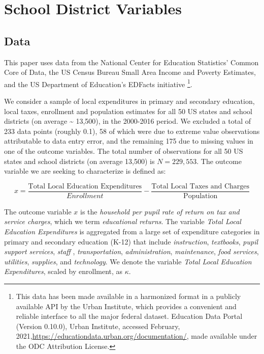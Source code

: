 \section{School District Variables}
\label{sec-2}

\subsection{Data}
\label{sec-2-1}


This paper uses data from the National Center for Education
Statistics’ Common Core of Data, the US Census Bureau Small Area
Income and Poverty Estimates, and the US Department of Education’s
EDFacts initiative \footnote{This data has been made available in a
harmonized format in a publicly available API by the Urban Institute,
which provides a convenient and reliable interface to all the major
federal dataset. Education Data Portal (Version 0.10.0), Urban
Institute, accessed February,
2021,\url{https://educationdata.urban.org/documentation/}, made available
under the ODC Attribution License.}.


We consider a sample of local expenditures in primary and secondary
education, local taxes, enrollment and population estimates for all 50
US states and school districts (on average \textasciitilde{} 13,500), in the 2000-2016
period.  We excluded a total of 233 data points (roughly 0.1\dataset), 58 of which were due to extreme value observations
attributable to data entry error, and the remaining 175 due to missing
values in one of the outcome variables. The total number of
observations for all 50 US states and school districts (on average
13,500) is $N= 229,553$. The outcome variable we are seeking to characterize is defined as:

\begin{equation}
\label{xdef}
x = \frac{\mbox{Total Local Education Expenditures}}{Enrollment} -
\frac{\mbox{Total Local Taxes and Charges}}{\mbox{Population}}
\end{equation}

The outcome variable $x$ is the \emph{household per pupil rate of return on tax and
service charges}, which we term \emph{educational returns}.  The variable \emph{Total Local Education Expenditures} is
aggregated from a large set of expenditure categories in primary and
secondary education (K-12) that include \emph{instruction}, \emph{textbooks},
\emph{pupil support services}, \emph{staff} , \emph{transportation},
\emph{administration}, \emph{maintenance}, \emph{food services}, \emph{utilities},
\emph{supplies}, and \emph{technology}. We denote the variable \emph{Total Local
Education Expenditures}, scaled by enrollment, as $\kappa$.

